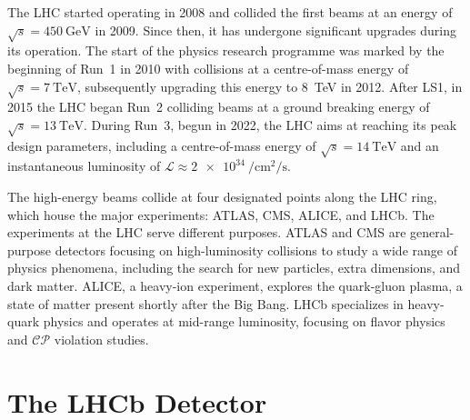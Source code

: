 The LHC started operating in 2008 and collided the first beams at an energy of $\sqrt{s}=\SI{450}{\giga\eV}$ in 2009. Since then, it has undergone significant upgrades during its operation. The start of the physics research programme was marked by the beginning of Run~1 in 2010 with collisions at a centre-of-mass energy of  $\sqrt{s}=\SI{7}{\tera\eV}$, subsequently upgrading this energy to \SI{8}{\tera\eV} in 2012. After LS1, in 2015 the LHC began Run~2 colliding beams at a ground breaking energy of  $\sqrt{s}=\SI{13}{\tera\eV}$. During Run~3, begun in 2022, the LHC aims at reaching its peak design parameters, including a centre-of-mass energy of $\sqrt{s}=\SI{14}{\tera\eV}$ and an instantaneous luminosity of $\mathcal{L}\approx\SI{2e34}{\per\centi\meter\squared\per\second}$.

The high-energy beams collide at four designated points along the LHC ring, which house the major experiments: ATLAS, CMS, ALICE, and LHCb.
The experiments at the LHC serve different purposes. ATLAS and CMS are general-purpose detectors focusing on high-luminosity collisions to study a wide range of physics phenomena, including the search for new particles, extra dimensions, and dark matter. ALICE, a heavy-ion experiment, explores the quark-gluon plasma, a state of matter present shortly after the Big Bang. LHCb specializes in heavy-quark physics and operates at mid-range luminosity, focusing on flavor physics and $\mathcal{CP}$ violation studies.

\section{The LHCb Detector}

